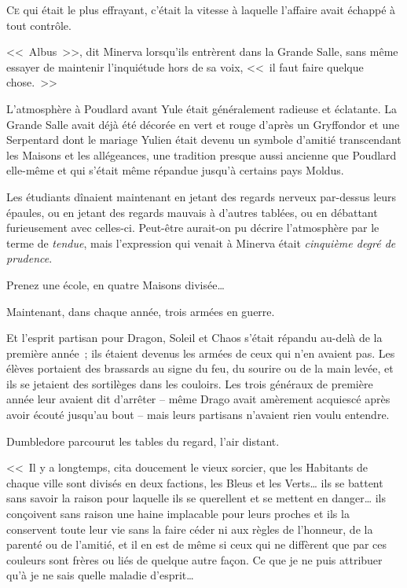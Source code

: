 

\lettrine{C}{e} qui était le plus effrayant, c'était la vitesse à laquelle l'affaire avait échappé à tout contrôle.

<<~Albus~>>, dit Minerva lorsqu'ils entrèrent dans la Grande Salle, sans même essayer de maintenir l'inquiétude hors de sa voix, <<~il faut faire quelque chose.~>>

L'atmosphère à Poudlard avant Yule était généralement radieuse et éclatante. La Grande Salle avait déjà été décorée en vert et rouge d'après un Gryffondor et une Serpentard dont le mariage Yulien était devenu un symbole d'amitié transcendant les Maisons et les allégeances, une tradition presque aussi ancienne que Poudlard elle-même et qui s'était même répandue jusqu'à certains pays Moldus.

Les étudiants dînaient maintenant en jetant des regards nerveux par-dessus leurs épaules, ou en jetant des regards mauvais à d'autres tablées, ou en débattant furieusement avec celles-ci. Peut-être aurait-on pu décrire l'atmosphère par le terme de \emph{tendue}, mais l'expression qui venait à Minerva était \emph{cinquième degré de prudence}.

Prenez une école, en quatre Maisons divisée…

Maintenant, dans chaque année, trois armées en guerre.

Et l'esprit partisan pour Dragon, Soleil et Chaos s'était répandu au-delà de la première année~; ils étaient devenus les armées de ceux qui n'en avaient pas. Les élèves portaient des brassards au signe du feu, du sourire ou de la main levée, et ils se jetaient des sortilèges dans les couloirs. Les trois généraux de première année leur avaient dit d'arrêter -- même Drago avait amèrement acquiescé après avoir écouté jusqu'au bout -- mais leurs partisans n'avaient rien voulu entendre.

Dumbledore parcourut les tables du regard, l'air distant.

<<~Il y a longtemps, cita doucement le vieux sorcier, que les Habitants de chaque ville sont divisés en deux factions, les Bleus et les Verts… ils se battent sans savoir la raison pour laquelle ils se querellent et se mettent en danger… ils conçoivent sans raison une haine implacable pour leurs proches et ils la conservent toute leur vie sans la faire céder ni aux règles de l'honneur, de la parenté ou de l'amitié, et il en est de même si ceux qui ne diffèrent que par ces couleurs sont frères ou liés de quelque autre façon. Ce que je ne puis attribuer qu'à je ne sais quelle maladie d'esprit…

